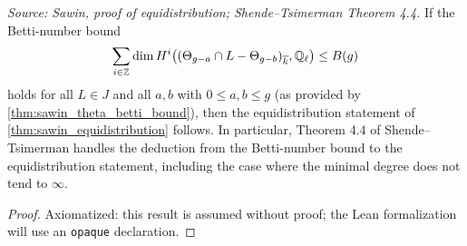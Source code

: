 \begin{theorem}
  \label{thm:ts_4_4}
  \textit{Source: Sawin, proof of equidistribution; Shende--Tsimerman Theorem 4.4.}
  If the Betti-number bound
  \[ \sum_{i\in\mathbb{Z}}\dim H^i\bigl((\Theta_{g-a}\cap L-\Theta_{g-b})_{\overline k},
     \mathbb{Q}_\ell\bigr) \le B(g) \]
  holds for all $L\in J$ and all $a,b$ with $0\le a,b\le g$ (as provided by
  \cref{thm:sawin_theta_betti_bound}), then the equidistribution statement of
  \cref{thm:sawin_equidistribution} follows.  In particular, Theorem 4.4 of
  Shende--Tsimerman handles the deduction from the Betti-number bound to the
  equidistribution statement, including the case where the minimal degree does not
  tend to $\infty$.
\end{theorem}

\begin{proof}
  Axiomatized: this result is assumed without proof; the Lean formalization will use
  an \texttt{opaque} declaration.
\end{proof}
